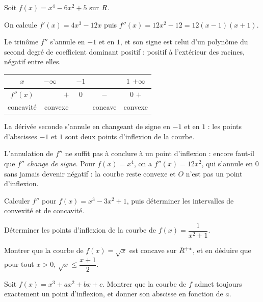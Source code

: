 \begin{exemple}
Soit $f(x) = x^{4} - 6x^{2} + 5$ sur $R$.

On calcule $f'(x) = 4x^{3} - 12x$ puis $f''(x) = 12x^{2} - 12 = 12(x-1)(x+1)$.

Le trinôme $f''$ s'annule en $-1$ et en $1$, et son signe est celui d'un
polynôme du second degré de coefficient dominant positif : positif à
l'extérieur des racines, négatif entre elles.

\medskip
\begin{center}
\begin{tabular}{c|ccccc}
$x$        & $-\infty$ & & $-1$ & & $1$ \hspace{0.9cm} $+\infty$ \\
\hline
$f''(x)$   & & $+$ & $0$ & $-$ & $0$ \hspace{1.1cm} $+$ \\
\hline
concavité  & \multicolumn{2}{c}{convexe} & & concave & \hspace{0.4cm} convexe \\
\end{tabular}
\end{center}
\medskip

La dérivée seconde s'annule en changeant de signe en $-1$ et en $1$ : les
points d'abscisses $-1$ et $1$ sont deux points d'inflexion de la courbe.
\end{exemple}

\begin{erreurclassique}
L'annulation de $f''$ ne suffit pas à conclure à un point d'inflexion : encore
faut-il que $f''$ \emph{change de signe}. Pour $f(x) = x^{4}$, on a
$f''(x) = 12x^{2}$, qui s'annule en $0$ sans jamais devenir négatif : la
courbe reste convexe et $O$ n'est pas un point d'inflexion.
\end{erreurclassique}

\begin{entrainement}[concavité]
\exo[\niveau{1}] Calculer $f''$ pour $f(x) = x^{3}-3x^{2}+1$, puis déterminer
les intervalles de convexité et de concavité.

\exo[\niveau{2}] Déterminer les points d'inflexion de la courbe de
$f(x) = \dfrac{1}{x^{2}+1}$.

\exo[\niveau{2}] Montrer que la courbe de $f(x) = \sqrt{x}$ est concave sur
$R^{+*}$, et en déduire que pour tout $x > 0$, $\sqrt{x} \leq \dfrac{x+1}{2}$.

\exo[\niveau{3}] Soit $f(x) = x^{3}+ax^{2}+bx+c$. Montrer que la courbe de $f$
admet toujours exactement un point d'inflexion, et donner son abscisse en
fonction de $a$.
\end{entrainement}

